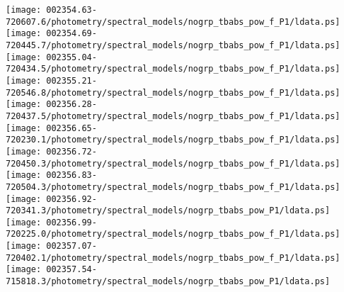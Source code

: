 \documentclass{aastex}
\begin{document}
\begin{figure*}[!ht]
\centering
\texttt{[image: 002354.63-720607.6/photometry/spectral\_models/nogrp\_tbabs\_pow\_f\_P1/ldata.ps]} \hfill 
\texttt{[image: 002354.69-720445.7/photometry/spectral\_models/nogrp\_tbabs\_pow\_f\_P1/ldata.ps]} \hfill 
\texttt{[image: 002355.04-720434.5/photometry/spectral\_models/nogrp\_tbabs\_pow\_f\_P1/ldata.ps]} \\ 
\vspace*{0.5in}
\texttt{[image: 002355.21-720546.8/photometry/spectral\_models/nogrp\_tbabs\_pow\_f\_P1/ldata.ps]} \hfill 
\texttt{[image: 002356.28-720437.5/photometry/spectral\_models/nogrp\_tbabs\_pow\_f\_P1/ldata.ps]} \hfill 
\texttt{[image: 002356.65-720230.1/photometry/spectral\_models/nogrp\_tbabs\_pow\_f\_P1/ldata.ps]} \\ 
\vspace*{0.5in}
\texttt{[image: 002356.72-720450.3/photometry/spectral\_models/nogrp\_tbabs\_pow\_f\_P1/ldata.ps]} \hfill 
\texttt{[image: 002356.83-720504.3/photometry/spectral\_models/nogrp\_tbabs\_pow\_f\_P1/ldata.ps]} \hfill 
\texttt{[image: 002356.92-720341.3/photometry/spectral\_models/nogrp\_tbabs\_pow\_P1/ldata.ps]} \\ 
\vspace*{0.5in}
\texttt{[image: 002356.99-720225.0/photometry/spectral\_models/nogrp\_tbabs\_pow\_f\_P1/ldata.ps]} \hfill 
\texttt{[image: 002357.07-720402.1/photometry/spectral\_models/nogrp\_tbabs\_pow\_f\_P1/ldata.ps]} \hfill 
\texttt{[image: 002357.54-715818.3/photometry/spectral\_models/nogrp\_tbabs\_pow\_P1/ldata.ps]} \\ 
\vspace*{0.5in}
\end{figure*}
\clearpage
\end{document}
